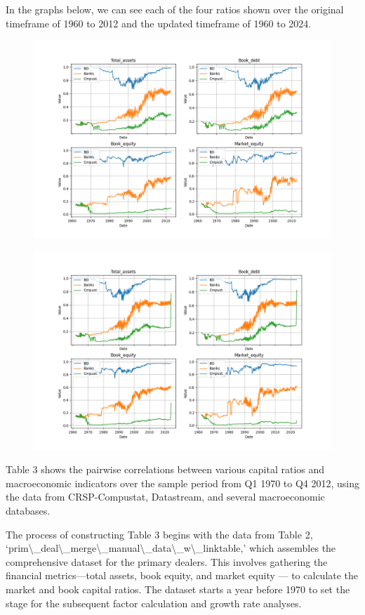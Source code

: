 \documentclass{article}
\begin{document}
\clearpage
In the graphs below, we can see each of the four ratios shown over the original timeframe of 1960 to 2012 and the updated timeframe of 1960 to 2024.\clearpage

\begin{figure}[htbp]\centering\includegraphics[width=\linewidth]{table02_figure.png}\end{figure}\clearpage
\begin{figure}[htbp]\centering\includegraphics[width=\linewidth]{updated_table02_figure.png}\end{figure}\clearpage
\clearpage

Table 3 shows the pairwise correlations between various capital ratios and macroeconomic indicators over the sample period from Q1 1970 to Q4 2012, using the data from CRSP-Compustat, Datastream, and several macroeconomic databases. 

The process of constructing Table 3 begins with the data from Table 2, ‘prim\textbackslash{}_deal\textbackslash{}_merge\textbackslash{}_manual\textbackslash{}_data\textbackslash{}_w\textbackslash{}_linktable,’ which assembles the comprehensive dataset for the primary dealers. This involves gathering the financial metrics—total assets, book equity, and market equity — to calculate the market and book capital ratios.  The dataset starts a year before 1970 to set the stage for the subsequent factor calculation and growth rate analyses.
\end{document}
